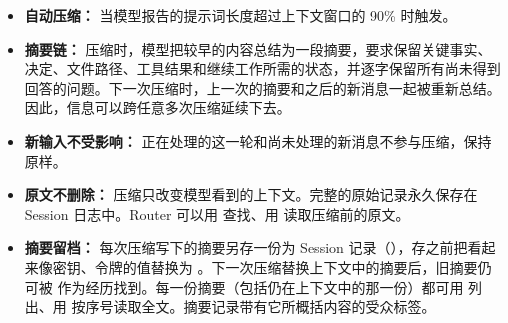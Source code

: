 \documentclass[UTF8,a4paper,11pt]{ctexart}
\begin{document}
\begin{itemize}
  \item \textbf{自动压缩：} 当模型报告的提示词长度超过上下文窗口的 90\% 时触发。
  \item \textbf{摘要链：} 压缩时，模型把较早的内容总结为一段摘要，要求保留关键事实、决定、文件路径、工具结果和继续工作所需的状态，并逐字保留所有尚未得到回答的问题。下一次压缩时，上一次的摘要和之后的新消息一起被重新总结。因此，信息可以跨任意多次压缩延续下去。
  \item \textbf{新输入不受影响：} 正在处理的这一轮和尚未处理的新消息不参与压缩，保持原样。
  \item \textbf{原文不删除：} 压缩只改变模型看到的上下文。完整的原始记录永久保存在 Session 日志中。Router 可以用  查找、用  读取压缩前的原文。
  \item \textbf{摘要留档：} 每次压缩写下的摘要另存一份为 Session 记录（），存之前把看起来像密钥、令牌的值替换为 \code{[redacted]}。下一次压缩替换上下文中的摘要后，旧摘要仍可被  作为经历找到。每一份摘要（包括仍在上下文中的那一份）都可用  列出、用  按序号读取全文。摘要记录带有它所概括内容的受众标签。
\end{itemize}
\end{document}
